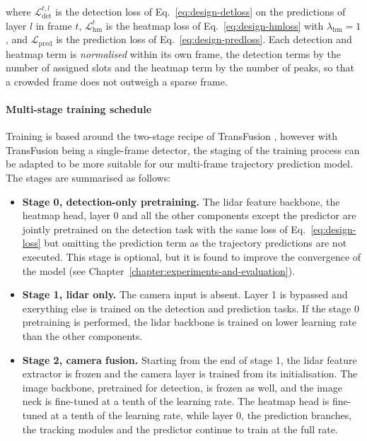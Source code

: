 where $\mathcal{L}_{\mathrm{det}}^{t,l}$ is the detection loss of Eq.~\eqref{eq:design-detloss} on the
predictions of layer $l$ in frame $t$, $\mathcal{L}_{\mathrm{hm}}^{t}$ is the heatmap loss of
Eq.~\eqref{eq:design-hmloss} with $\lambda_{\mathrm{hm}} = 1$, and $\mathcal{L}_{\mathrm{pred}}$ is the
prediction loss of Eq.~\eqref{eq:design-predloss}. Each detection and heatmap term is \emph{normalised} within its own
frame, the detection terms by the number of assigned slots and the heatmap term by the number of peaks, so that
a crowded frame does not outweigh a sparse frame.

\paragraph{Multi-stage training schedule}
\label{subsec:design-schedule}

Training is based around the two-stage recipe of TransFusion \cite{Bai2022TransFusion}, however with TransFusion being a single-frame detector,
the staging of the training process can be adapted to be more suitable for our multi-frame trajectory prediction model. The stages are summarised as follows:

\begin{itemize}
    \item \textbf{Stage 0, detection-only pretraining.} The \ac{lidar} feature backbone, the heatmap head, layer 0 and all the other components except the predictor are jointly pretrained on the detection 
    task with the same loss of Eq.~\eqref{eq:design-loss} but omitting the prediction term as the trajectory predictions are not executed. This stage is optional, but it is found to improve the convergence of the model (see Chapter~\ref{chapter:experiments-and-evaluation}).
    \item \textbf{Stage 1, \ac{lidar} only.} The camera input is absent. Layer 1 is bypassed and exerything else is trained on the detection and prediction tasks. If the stage 0 pretraining is performed, the \ac{lidar} backbone is trained on lower learning rate than the other components.
    \item \textbf{Stage 2, camera fusion.} Starting from the end of stage 1, the \ac{lidar} feature extractor
    is frozen and the camera layer is trained from its initialisation. The image backbone, pretrained for
    detection, is frozen as well, and the image neck is fine-tuned at a tenth of the learning rate. The
    heatmap head is fine-tuned at a tenth of the learning rate, while layer 0, the prediction branches, the
    tracking modules and the predictor continue to train at the full rate.
\end{itemize}

